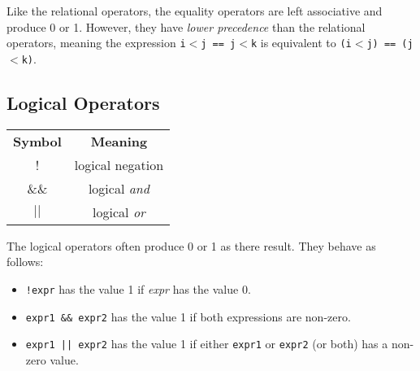 \documentclass{article}
\begin{document}
\noindent Like the relational operators, the equality operators are left associative and produce 0 or 1.  However, they have \textit{lower precedence} than the relational operators, meaning the expression 
\texttt{i$<$j == j$<$k} is equivalent to \texttt{(i$<$j) == (j$<$k)}.

\subsection{Logical Operators}

\begin{center}
\begin{tabular}{ |c|c| } 
 \hline
 \textbf{Symbol} & \textbf{Meaning}  \\ 
 ! & logical negation  \\ 
 \&\& & logical \textit{and}  \\ 
 $||$ & logical \textit{or}\\
 \hline
\end{tabular}
\end{center}

\noindent The logical operators often produce 0 or 1 as there result. They behave as follows:

\begin{itemize}
  \item \texttt{!expr} has the value 1 if \textit{expr} has the value 0.
  \item \texttt{expr1 \&\& expr2} has the value 1 if both expressions are non-zero.
  \item \texttt{expr1 || expr2} has the value 1 if either \texttt{expr1} or \texttt{expr2} (or both) has a non-zero value.
\end{itemize}
\end{document}
